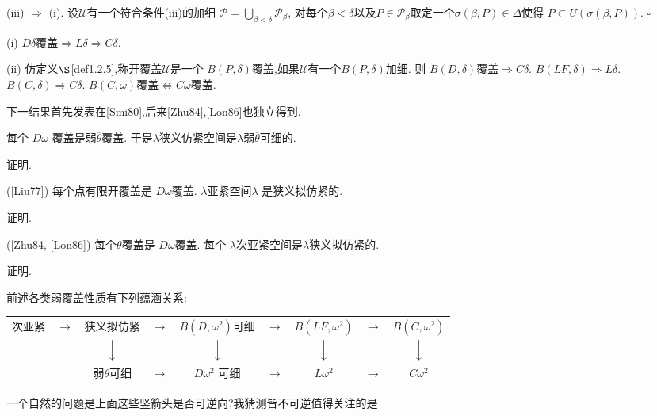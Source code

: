\documentclass[main.tex]{subfiles}
\begin{document}
(iii) $\Rightarrow$ (i). 设$\mathscr{U}$有一个符合条件(iii)的加细
$\mathscr{P}=\bigcup_{\beta<\delta}\mathscr{P}_\beta$,
对每个$\beta<\delta$以及$P\in\mathscr{P}_\beta$取定一个$\sigma(\beta,P)\in\Delta$使得
$P\subset U(\sigma(\beta,P))$.
$\square$

\begin{corollary}
	\textnormal{(i)}  $D\delta$覆盖$\Rightarrow L\delta \Rightarrow C\delta$.
	
	\textnormal{(ii)} 仿定义$\S$\ref{def1.2.5},称开覆盖$\mathscr{U}$是一个
	\underline{$B(P,\delta)$覆盖},如果$\mathscr{U}$有一个$B(P,\delta)$加细.
	则
	$B(D,\delta)$覆盖$\Rightarrow C\delta$. 
	$B(LF,\delta)\Rightarrow L\delta$. 
	$B(C,\delta)\Rightarrow C\delta$. 
	$B(C,\omega)$覆盖$\Leftrightarrow C\omega$覆盖. 
\end{corollary}

下一结果首先发表在[Smi80],后来[Zhu84],[Lon86]也独立得到.

\begin{theorem}
	每个 $D\omega$ 覆盖是弱$\overline{\theta}$覆盖.
	于是$\lambda$狭义仿紧空间是$\lambda$弱$\overline{\theta}$可细的.
\end{theorem}

证明.

\begin{theorem}
	\textnormal{([Liu77])} 每个点有限开覆盖是 $D\omega$覆盖. $\lambda$亚紧空间$\lambda$
	是狭义拟仿紧的.
\end{theorem}

证明.


\begin{theorem}
	\textnormal{([Zhu84, [Lon86])} 每个$\theta$覆盖是 $D\omega$覆盖. 每个 $\lambda$次亚紧空间是$\lambda$狭义拟仿紧的.
\end{theorem}

证明.

前述各类弱覆盖性质有下列蕴涵关系\textnormal{:}

\vspace{.3cm}
\begin{tabular}{ccccccccc}
次亚紧 & $\longrightarrow$ & 狭义拟仿紧&$\longrightarrow$&$B(D, \omega^2)$可细&
   $\longrightarrow$ & $B(LF, \omega^2)$ & $\longrightarrow$ & $B(C, \omega^2)$ \\
   & & $\Big\downarrow$ & & $\Big\downarrow$  & & $\Big\downarrow$ &&$\Big\downarrow$ \\
 & & 弱$\overline{\theta}$可细&$\longrightarrow$&$D\omega^2$ 可细&
$\longrightarrow$ & $L\omega^2$ & $\longrightarrow$ & $C\omega^2$ \\
 \end{tabular}

\vspace{.3cm}

一个自然的问题是上面这些竖箭头是否可逆向?我猜测皆不可逆值得关注的是
\end{document}
